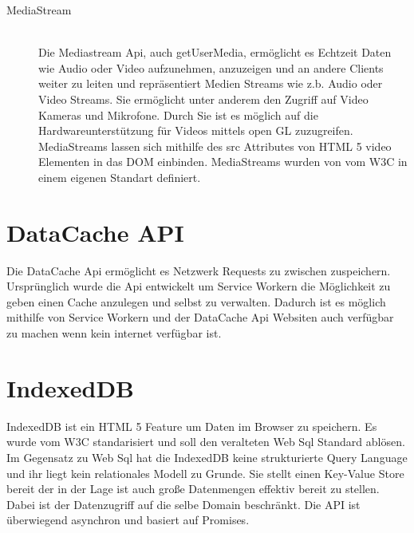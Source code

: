 \begin{description}
\item[MediaStream]\hfill \\
Die Mediastream Api, auch getUserMedia, ermöglicht es Echtzeit Daten wie Audio oder Video aufzunehmen, anzuzeigen und an andere Clients weiter zu leiten und repräsentiert Medien Streams wie z.b. Audio oder Video Streams. Sie ermöglicht unter anderem den Zugriff auf Video Kameras und Mikrofone. Durch Sie ist es möglich auf die Hardwareunterstützung für Videos mittels open GL zuzugreifen. MediaStreams lassen sich mithilfe des src Attributes von HTML 5 video Elementen in das DOM einbinden. MediaStreams wurden von vom W3C in einem eigenen Standart definiert.\cite{w3MediaStream} 

\end{description}



\section{DataCache API}

Die DataCache Api ermöglicht es Netzwerk Requests zu zwischen zuspeichern.\cite{google-cache-api} Ursprünglich wurde die Api entwickelt um Service Workern die Möglichkeit zu geben einen Cache anzulegen und selbst zu verwalten. Dadurch ist es möglich mithilfe von Service Workern und der DataCache Api Websiten auch verfügbar zu machen wenn kein internet verfügbar ist. 


\section{IndexedDB}

IndexedDB ist ein HTML 5 Feature um Daten im Browser zu speichern. Es wurde vom W3C standarisiert\cite{w3IndexedDB} und soll den veralteten Web Sql Standard ablösen. Im Gegensatz zu Web Sql hat die IndexedDB keine strukturierte Query Language und ihr liegt kein relationales Modell zu Grunde. Sie stellt einen Key-Value Store bereit der in der Lage ist auch große Datenmengen effektiv bereit zu stellen. Dabei ist der Datenzugriff auf die selbe Domain beschränkt. Die API ist überwiegend asynchron und basiert auf Promises.

